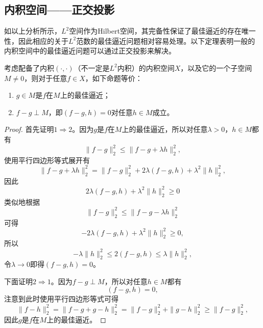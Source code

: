 \documentclass[a4paper,10pt]{ctexart}
\begin{document}
\subsection{内积空间——正交投影}
如以上分析所示，$ L^2 $空间作为Hilbert空间，其完备性保证了最佳逼近的存在唯一性，因此相应的关于$ L^2 $范数的最佳逼近问题相对容易处理。以下定理表明一般的内积空间中的最佳逼近问题可以通过正交投影来解决。
\begin{theorem}
    考虑配备了内积$ (\cdot,\cdot) $（不一定是$ L^2 $内积）的内积空间$ X $，以及它的一个子空间$ M\ne 0 $，则对于任意$ f\in X $，如下命题等价：
    \begin{enumerate}
        \item $ g\in M $是$ f $在$ M $上的最佳逼近；
        \item $ f-g\perp M $，即$ (f-g,h) = 0 $对任意$ h\in M $成立。
    \end{enumerate}
\end{theorem}
\begin{proof}
    首先证明$ 1\Rightarrow 2 $。因为$ g $是$ f $在$ M $上的最佳逼近，所以对任意$ \lambda>0 $，$ h\in M $都有
    \[
        \| f-g \|_2^2 \leqslant \| f - g+\lambda h \|_2^2,
    \]
    使用平行四边形等式展开有
    \[
        \| f - g+\lambda h \|_2^2 = \| f - g \|_2^2 + 2\lambda (f-g,h) + \lambda^2 \| h \|_2^2,
    \]
    因此
    \[
        2\lambda (f-g,h) + \lambda^2 \| h \|_2^2\geqslant 0
    \]
    类似地根据
    \[
        \| f-g \|_2^2 \leqslant \| f - g-\lambda h \|_2^2
    \]
    可得
    \[
        -2\lambda (f-g,h) + \lambda^2 \| h \|_2^2\geqslant 0,
    \]
    所以
    \[
        -\lambda \| h \|_2^2 \leqslant 2(f-g,h) \leqslant \lambda \| h \|_2^2,
    \]
    令$ \lambda\to 0 $即得$ (f-g,h) = 0 $。

    下面证明$ 2\Rightarrow 1 $。因为$ f-g\perp M $，所以对任意$ h\in M $都有
    \[
        (f-g,h) = 0,
    \]
    注意到此时使用平行四边形等式可得
    \[
        \| f-h \|_2^2 = \| f-g+g-h \|_2^2 = \| f-g \|_2^2 + \| g-h \|_2^2 \geqslant \| f-g \|_2^2,
    \]
    因此$ g $是$ f $在$ M $上的最佳逼近。
\end{proof}
\end{document}
